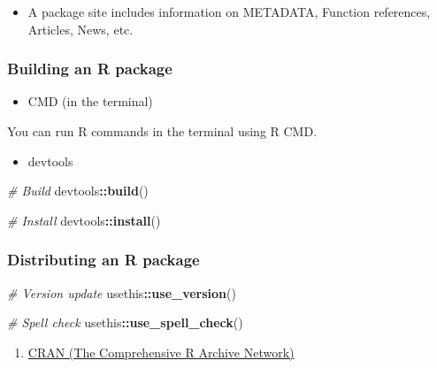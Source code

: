 \documentclass[
]{book}
\newenvironment{Shaded}{\begin{snugshade}}{\end{snugshade}}
\newcommand{\CommentTok}[1]{\textcolor[rgb]{0.56,0.35,0.01}{\textit{#1}}}
\newcommand{\KeywordTok}[1]{\textcolor[rgb]{0.13,0.29,0.53}{\textbf{#1}}}
\newcommand{\NormalTok}[1]{#1}
\newcommand{\OperatorTok}[1]{\textcolor[rgb]{0.81,0.36,0.00}{\textbf{#1}}}
\providecommand{\tightlist}{%
  \setlength{\itemsep}{0pt}\setlength{\parskip}{0pt}}
\begin{document}
\begin{itemize}
\tightlist
\item
  A package site includes information on METADATA, Function references, Articles, News, etc.
\end{itemize}

\hypertarget{building-an-r-package}{%
\subsubsection{Building an R package}\label{building-an-r-package}}

\begin{itemize}
\tightlist
\item
  CMD (in the terminal)
\end{itemize}

You can run R commands in the terminal using R CMD.

\begin{itemize}
\tightlist
\item
  devtools
\end{itemize}

\begin{Shaded}
\begin{Highlighting}[]
\CommentTok{\# Build }
\NormalTok{devtools}\OperatorTok{::}\KeywordTok{build}\NormalTok{()}

\CommentTok{\# Install }
\NormalTok{devtools}\OperatorTok{::}\KeywordTok{install}\NormalTok{()}
\end{Highlighting}
\end{Shaded}

\hypertarget{distributing-an-r-package}{%
\subsubsection{Distributing an R package}\label{distributing-an-r-package}}

\begin{Shaded}
\begin{Highlighting}[]
\CommentTok{\# Version update }
\NormalTok{usethis}\OperatorTok{::}\KeywordTok{use\_version}\NormalTok{()}

\CommentTok{\# Spell check}
\NormalTok{usethis}\OperatorTok{::}\KeywordTok{use\_spell\_check}\NormalTok{()}
\end{Highlighting}
\end{Shaded}

\begin{enumerate}
\def\labelenumi{\arabic{enumi}.}
\tightlist
\item
  \href{https://cran.r-project.org/}{CRAN (The Comprehensive R Archive Network)}
\end{enumerate}
\end{document}
